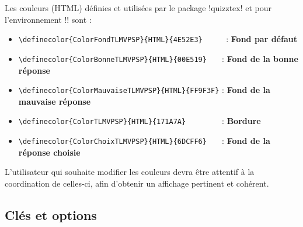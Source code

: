 \documentclass[french,a4paper,11pt]{article}
\begin{document}
\begin{tipblock}
Les couleurs (HTML) définies et utilisées par le package \packagetex!quizztex! et pour l'environnement \motcletex!\QuizzMillions! sont :

\begin{itemize}[leftmargin=*]
	\item \verb!\definecolor{ColorFondTLMVPSP}{HTML}{4E52E3}     ! : \textcolor{ColorFondTLMVPSP}{\textsf{\textbf{Fond par défaut}}}
	\item \verb!\definecolor{ColorBonneTLMVPSP}{HTML}{00E519}   ! : \textcolor{ColorBonneTLMVPSP}{\textsf{\textbf{Fond de la bonne réponse}}}
	\item \verb!\definecolor{ColorMauvaiseTLMVPSP}{HTML}{FF9F3F}! : \textcolor{ColorMauvaiseTLMVPSP}{\textsf{\textbf{Fond de la mauvaise réponse}}}
	\item \verb!\definecolor{ColorTLMVPSP}{HTML}{171A7A}        ! : \textcolor{ColorTLMVPSP}{\textsf{\textbf{Bordure}}}
	\item \verb!\definecolor{ColorChoixTLMVPSP}{HTML}{6DCFF6}   ! : \textcolor{ColorChoixTLMVPSP}{\textsf{\textbf{Fond de la réponse choisie}}}
\end{itemize}

L'utilisateur qui souhaite modifier les couleurs devra être attentif à la coordination de celles-ci, afin d'obtenir un affichage pertinent et cohérent.
\end{tipblock}

\begin{DemoCode}[]
\QuizzPrendrePlace{\lipsum[1][1-2]}
{\lipsum[2][1]}{\lipsum[2][2]}{\lipsum[2][3]}{\lipsum[2][5]}
\end{DemoCode}

\subsection{Clés et options}
\end{document}
